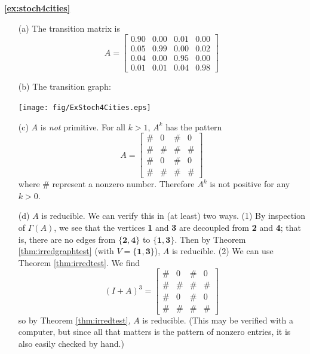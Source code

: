 %
\newpage
%
\textbf{\ref{ex:stoch4cities}}
\begin{enumerate}
\item[(a)]
The transition matrix is
\[
   A = \begin{bmatrix}
         0.90 & 0.00 & 0.01 & 0.00 \\
	 0.05 & 0.99 & 0.00 & 0.02 \\
	 0.04 & 0.00 & 0.95 & 0.00 \\
	 0.01 & 0.01 & 0.04 & 0.98
       \end{bmatrix}
\]
\item[(b)] The transition graph:

\medskip
\centerline{\texttt{[image: fig/ExStoch4Cities.eps]}}

\item[(c)]
$A$ is \emph{not} primitive.
For all $k > 1$, $A^k$ has the pattern
\[
   A = \begin{bmatrix}
         \# & 0  & \# & 0  \\
	 \# & \# & \# & \# \\
	 \# & 0  & \# & 0  \\
	 \# & \# & \# & \#
       \end{bmatrix}
\]
where $\#$ represent a nonzero number.
Therefore
$A^k$ is not positive for any $k > 0$.

\item[(d)]
$A$ is reducible.  We can verify this in (at least) two
ways. (1) By inspection of $\Gamma(A)$, we see that
the vertices \textbf{1} and \textbf{3} are decoupled
from \textbf{2} and \textbf{4}; that is, there are
no edges from $\{\textbf{2},\textbf{4}\}$ to
$\{\textbf{1},\textbf{3}\}$.
Then by Theorem \ref{thm:irredgraphtest}
(with $V = \{\textbf{1},\textbf{3}\}$), $A$
is reducible.
(2) We can use Theorem \ref{thm:irredtest}.
We find
\[
   (I+A)^3 = \begin{bmatrix}
         \# & 0  & \# & 0  \\
	 \# & \# & \# & \# \\
	 \# & 0  & \# & 0  \\
	 \# & \# & \# & \#
       \end{bmatrix}
\]
so by Theorem \ref{thm:irredtest}, $A$ is reducible.
(This may be verified with a computer, but since all
that matters is the pattern of nonzero entries, it is
also easily checked by hand.)


\end{enumerate}
